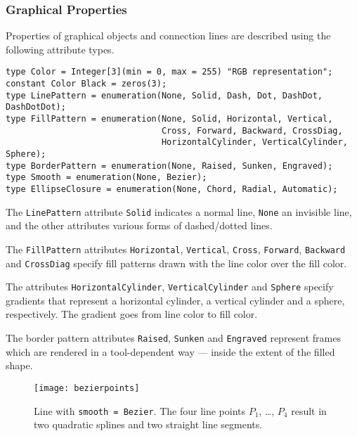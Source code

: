 \subsubsection{Graphical Properties}\label{graphical-properties}

Properties of graphical objects and connection lines are described using the following attribute types.
\begin{lstlisting}[language=modelica]
type Color = Integer[3](min = 0, max = 255) "RGB representation";
constant Color Black = zeros(3);
type LinePattern = enumeration(None, Solid, Dash, Dot, DashDot, DashDotDot);
type FillPattern = enumeration(None, Solid, Horizontal, Vertical,
                               Cross, Forward, Backward, CrossDiag,
                               HorizontalCylinder, VerticalCylinder, Sphere);
type BorderPattern = enumeration(None, Raised, Sunken, Engraved);
type Smooth = enumeration(None, Bezier);
type EllipseClosure = enumeration(None, Chord, Radial, Automatic);
\end{lstlisting}%
The \lstinline!LinePattern! attribute \lstinline!Solid! indicates a normal line, \lstinline!None! an invisible line, and the other attributes various forms of dashed/dotted lines.

The \lstinline!FillPattern! attributes \lstinline!Horizontal!, \lstinline!Vertical!, \lstinline!Cross!, \lstinline!Forward!, \lstinline!Backward! and \lstinline!CrossDiag! specify fill patterns drawn with the line color over the fill color.

The attributes \lstinline!HorizontalCylinder!, \lstinline!VerticalCylinder! and \lstinline!Sphere! specify gradients that represent a horizontal cylinder, a vertical cylinder and a sphere, respectively.
The gradient goes from line color to fill color.

The border pattern attributes \lstinline!Raised!, \lstinline!Sunken! and \lstinline!Engraved! represent frames which are rendered in a tool-dependent way --- inside the extent of the filled shape.

\begin{figure}[H]
  \begin{center}
    \texttt{[image: bezierpoints]}
  \end{center}
  \caption{
    Line with \lstinline!smooth = Bezier!.
    The four line points $P_{1}$, \ldots{}, $P_{4}$ result in two quadratic splines and two straight line segments.
  }
  \label{fig:smooth-bezier}
\end{figure}

